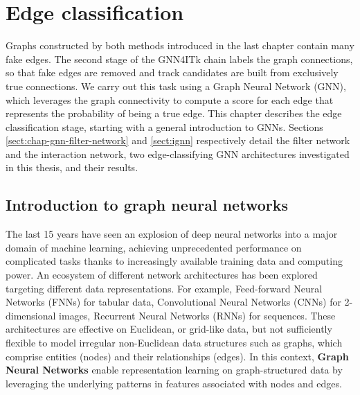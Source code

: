 \chapter{Edge classification}
\label{chap:gnn}

Graphs constructed by both methods introduced in the last chapter contain many fake edges.
The second stage of the GNN4ITk chain labels the graph connections, so that fake edges are removed and track candidates are built from exclusively true connections. 
We carry out this task using a Graph Neural Network (GNN), which leverages the graph connectivity to compute a score for each edge that represents the probability of being a true edge.
This chapter describes the edge classification stage, starting with a general introduction to GNNs.
Sections \ref{sect:chap-gnn-filter-network} and \ref{sect:ignn} respectively detail the filter network and the interaction network, two edge-classifying GNN architectures investigated in this thesis, and their results. 

\section{Introduction to graph neural networks}
\label{sect:chap-gnn-intro-to-graph-network}

The last 15 years have seen an explosion of deep neural networks into a major domain of machine learning, achieving unprecedented performance on complicated tasks thanks to increasingly available training data and computing power. 
An ecosystem of different network architectures has been explored targeting different data representations. 
For example, Feed-forward Neural Networks (FNNs) for tabular data, Convolutional Neural Networks (CNNs) for 2-dimensional images, Recurrent Neural Networks (RNNs) for sequences.
These architectures are effective on Euclidean, or grid-like data, but not sufficiently flexible to model irregular non-Euclidean data structures such as graphs, which comprise entities (nodes) and their relationships (edges). 
In this context, \textbf{Graph Neural Networks} enable representation learning on graph-structured data by leveraging the underlying patterns in features associated with nodes and edges.

